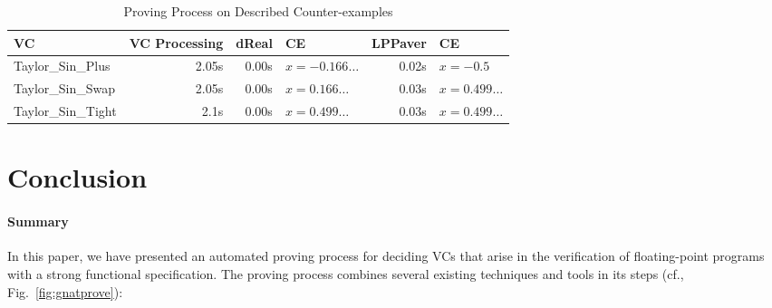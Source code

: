 \documentclass[runningheads]{llncs}
\begin{document}
\begin{table}[t]
  \caption{Proving Process on Described Counter-examples}
  \label{table:counter-examples}
  \centering
  \begin{tabular}{l@{\kern-2em}r@{\kern1em}r@{\kern1em}l@{\kern1em}r@{\kern1em}l}
  \toprule
  VC                 & VC Processing & dReal & CE & LPPaver & CE \\
  \midrule
  Taylor\_Sin\_Plus  & 2.05s         & 0.00s &  $x=-0.166\ldots$  & 0.02s & $x=-0.5$ \\
  Taylor\_Sin\_Swap  & 2.05s         & 0.00s &  $x=0.166\ldots$   & 0.03s & $x=0.499\ldots$\\
  Taylor\_Sin\_Tight & 2.1s          & 0.00s &  $x=0.499\ldots $  & 0.03s & $x=0.499\ldots$\\
  \bottomrule
  \end{tabular}
\end{table}


\section{Conclusion}\label{sec:conclusion}

\paragraph{Summary}
In this paper, we have presented an automated proving process for deciding VCs that arise in the verification of floating-point programs with a strong functional specification.
The proving process combines several existing techniques and tools in its steps (cf., Fig.~\ref{fig:gnatprove}):
\end{document}
